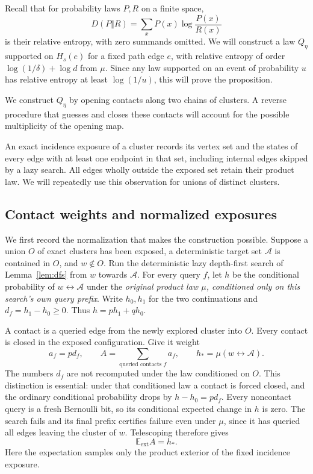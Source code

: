 \documentclass[11pt]{article}
\theoremstyle{definition}
\newcommand{\EE}{\mathbb E}
\begin{document}
Recall that for probability laws $P,R$ on a finite space,
\[
 D(P\Vert R)=\sum_x P(x)\log\frac{P(x)}{R(x)}
\]
is their relative entropy, with zero summands omitted. We will construct
a law $Q_\eta$ supported on $H_s(e)$ for a fixed path edge $e$, with
relative entropy of order $\log(1/\delta)+\log d$ from $\mu$.
Since any law supported on an event of probability $u$ has relative
entropy at least $\log(1/u)$, this will prove the proposition.

We construct $Q_\eta$ by opening contacts along two chains of clusters.
A reverse procedure that guesses and closes these contacts will account
for the possible multiplicity of the opening map.

An exact incidence exposure of a cluster records its vertex set and the
states of every edge with at least one endpoint in that set, including
internal edges skipped by a lazy search. All edges wholly outside the
exposed set retain their product law. We will repeatedly use this
observation for unions of distinct clusters.

\subsection{Contact weights and normalized exposures}

We first record the normalization that makes the construction possible.
Suppose a union $O$ of exact clusters has been exposed, a deterministic
target set $\mathcal A$ is contained in $O$, and $w\notin O$.
Run the deterministic lazy depth-first search of Lemma~\ref{lem:dfs}
from $w$ towards $\mathcal A$. For every query $f$, let $h$ be the
conditional probability of $w\leftrightarrow\mathcal A$ under the
\emph{original product law $\mu$, conditioned only on this search's
own query prefix}. Write $h_0,h_1$ for the two continuations and
$d_f=h_1-h_0\ge0$. Thus $h=ph_1+qh_0$.

A contact is a queried edge from the newly explored cluster into $O$.
Every contact is closed in the exposed configuration. Give it weight
\[
 a_f=pd_f,
 \qquad A=\sum_{\text{queried contacts }f}a_f,
 \qquad h_* =\mu(w\leftrightarrow\mathcal A).
\]
The numbers $d_f$ are not recomputed under the law conditioned on $O$.
This distinction is essential: under that conditioned law a contact is
forced closed, and the ordinary conditional probability drops by
$h-h_0=pd_f$. Every noncontact query is a fresh Bernoulli bit, so its
conditional expected change in $h$ is zero. The search fails and its
final prefix certifies failure even under $\mu$, since it has queried
all edges leaving the cluster of $w$. Telescoping therefore gives
\begin{equation}\label{eq:contact-normalization}
 \EE_{\mathrm{ext}}A=h_*.
\end{equation}
Here the expectation samples only the product exterior of the fixed
incidence exposure.
\end{document}
